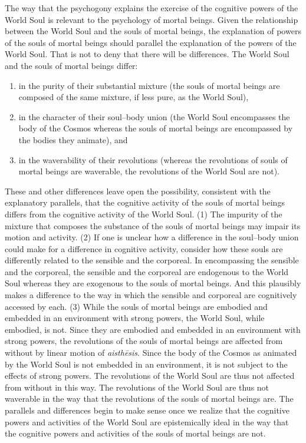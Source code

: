 The way that the psychogony explains the exercise of the cognitive powers of the World Soul is relevant to the psychology of mortal beings. Given the relationship between the World Soul and the souls of mortal beings, the explanation of powers of the souls of mortal beings should parallel the explanation of the powers of the World Soul. That is not to deny that there will be differences. The World Soul and the souls of mortal beings differ:
\begin{enumerate}[(1)]
	\item in the purity of their substantial mixture (the souls of mortal beings are composed of the same mixture, if less pure, as the World Soul),
	\item in the character of their soul--body union (the World Soul encompasses the body of the Cosmos whereas the souls of mortal beings are encompassed by the bodies they animate), and
	\item in the waverability of their revolutions (whereas the revolutions of souls of mortal beings are waverable, the revolutions of the World Soul are not).
\end{enumerate}
These and other differences leave open the possibility, consistent with the explanatory parallels, that the cognitive activity of the souls of mortal beings differs from the cognitive activity of the World Soul. (1) The impurity of the mixture that composes the substance of the souls of mortal beings may impair its motion and activity. (2) If one is unclear how a difference in the soul--body union could make for a difference in cognitive activity, consider how these souls are differently related to the sensible and the corporeal. In encompassing the sensible and the corporeal, the sensible and the corporeal are endogenous to the World Soul whereas they are exogenous to the souls of mortal beings. And this plausibly makes a difference to the way in which the sensible and corporeal are cognitively accessed by each. (3) While the souls of mortal beings are embodied and embedded in an environment with strong powers, the World Soul, while embodied, is not. Since they are embodied and embedded in an environment with strong powers, the revolutions of the souls of mortal beings are affected from without by linear motion of \emph{aisthēsis}. Since the body of the Cosmos as animated by the World Soul is not embedded in an environment, it is not subject to the effects of strong powers. The revolutions of the World Soul are thus not affected from without in this way. The revolutions of the World Soul are thus not waverable in the way that the revolutions of the souls of mortal beings are. The parallels and differences begin to make sense once we realize that the cognitive powers and activities of the World Soul are epistemically ideal in the way that the cognitive powers and activities of the souls of mortal beings are not.


